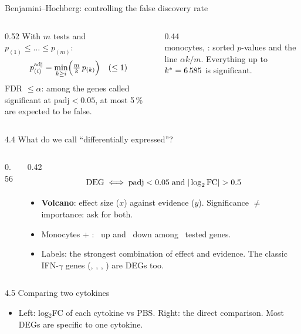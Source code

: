 \begin{frame}{Benjamini--Hochberg: controlling the false discovery rate}
  \begin{columns}[T]
    \begin{column}{0.52\linewidth}
      With $m$ tests and $p_{(1)}\le\dots\le p_{(m)}$:
      \[ p^{\mathrm{adj}}_{(i)}=\min_{k\ge i}\Bigl(\tfrac{m}{k}\,p_{(k)}\Bigr)\quad(\le1) \]
      \small
      \alert{FDR} $\le\alpha$: among the genes called significant at $\mathrm{padj}<0.05$, at most 5\,\% are expected to be false.\\[0.15cm]
      \scriptsize
      
    \end{column}
    \begin{column}{0.44\linewidth}
      \\[-0.1cm]
      \scriptsize monocytes, \IFNg: sorted $p$-values and the line $\alpha k/m$. Everything up to $k^*=6\,585$ is significant.
    \end{column}
  \end{columns}
\end{frame}

\begin{frame}{4.4 What do we call ``differentially expressed''?}
  \begin{columns}[c]
    \begin{column}{0.56\linewidth}
    \end{column}
    \begin{column}{0.42\linewidth}\small
      \[
        \text{DEG}\;\Longleftrightarrow\;\mathrm{padj}<0.05\;\text{and}\;|\lfc|>0.5
      \]
      \begin{itemize}\setlength\itemsep{3pt}
        \item \textbf{Volcano}: effect size ($x$) against evidence ($y$). Significance $\neq$ importance: ask for both.
        \item Monocytes + \IFNg: \alert{\numnup\ up} and \alert{\numndown\ down} among \numntested\ tested genes.
        \item Labels: the strongest combination of effect and evidence. The classic IFN-$\gamma$ genes (, , , ) are DEGs too.
      \end{itemize}
    \end{column}
  \end{columns}
\end{frame}

\begin{frame}{4.5 Comparing two cytokines}
  \centering
  \\[-2pt]
  \scriptsize
  
  \begin{itemize}\footnotesize\setlength\itemsep{1pt}
    \item Left: log$_2$FC of each cytokine vs PBS. Right: the direct comparison. Most DEGs are \alert{specific} to one cytokine.
  \end{itemize}
\end{frame}


